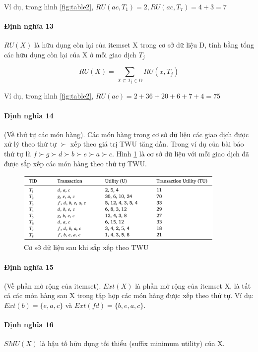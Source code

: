 Ví dụ, trong hình \ref{fig:table2}, $RU(ac, T_1) = 2, RU(ac, T_7) = 4 + 3 = 7 $  

\paragraph{Định nghĩa 13} $RU(X)$ là hữu dụng còn lại của itemset X trong cơ sở dữ liệu D, tính bằng tổng các hữu dụng còn lại của X ở mỗi giao dịch $T_j$

$$ RU(X) = \sum_{X \subseteq T_j \in D} RU(x, T_j) $$

Ví dụ, trong hình \ref{fig:table2}, $RU(ac) = 2 + 36 + 20 + 6 + 7 + 4 = 75$

\paragraph{Định nghĩa 14} (Về thứ tự các món hàng). Các món hàng trong cơ sở dữ liệu các giao dịch được xử lý theo thứ tự $\succ$ xếp theo giá trị TWU tăng dần. Trong ví dụ của bài báo thứ tự là $ f \succ g \succ d \succ b \succ e \succ a \succ c $. Hình \ref{fig:table5} là cơ sở dữ liệu với mỗi giao dịch đã được sắp xếp các món hàng theo thứ tự TWU. 

\begin{figure}[h]
\centering
\includegraphics[width=0.9\textwidth]{image/table/table5.PNG}
\caption{\label{fig:table5} Cơ sở dữ liệu sau khi sắp xếp theo TWU  }
\end{figure}

\paragraph{Định nghĩa 15} (Về phần mở rộng của itemset). $Ext(X)$ là phần mở rộng của itemset X, là tất cả các món hàng sau X trong tập hợp các món hàng được xếp theo thứ tự. Ví dụ: $Ext(b) = \{ e, a, c \}$ và $Ext(fd) = \{b, e, a, c \}$.

\paragraph{Định nghĩa 16} $SMU(X)$ là hậu tố hữu dụng tối thiểu (suffix minimum utility) của X. 

